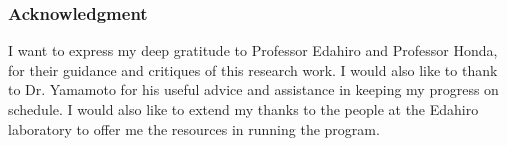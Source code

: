 
\subsubsection*{Acknowledgment}

I want to express my deep gratitude to Professor Edahiro and Professor Honda, for their guidance and critiques of this research work. I would also like to thank to Dr. Yamamoto for his useful advice and assistance in keeping my progress on schedule. I would also like to extend my thanks to the people at the Edahiro laboratory to offer me the resources in running the program.
